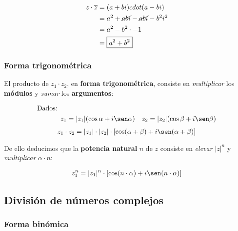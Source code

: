 \documentclass[12pt]{article}
\begin{document}
\begin{align*}
    z \cdot \overline{z} & = (a + bi) cdot (a - bi)                      \\
                         & = a^2 + \cancel{ abi} - \cancel{abi} - b^2i^2 \\
                         & = a^2 - b^2 \cdot -1                          \\
                         & = \boxed{a^2 + b^2}                           \\
\end{align*}

\subsubsection{Forma trigonométrica}

El producto de \(z_{1} \cdot z_{2}\),
en \textbf{forma trigonométrica},
consiste en \textit{multiplicar} los \textbf{módulos} y
\textit{sumar} los \textbf{argumentos}:

\begin{align*}
    \text{Dados: } &                                                                                     \\
                   & z_{1} = |z_{1}|(\cos\alpha + i\sen\alpha) & z_{2} = |z_{2}|(\cos\beta + i\sen\beta) \\
\end{align*}
\begin{align*}
    z_{1} \cdot z_{2} = |z_{1}| \cdot |z_{2}| \cdot [\cos(\alpha+\beta) + i\sen(\alpha+\beta)] \\
\end{align*}

De ello deducimos que la \textbf{potencia natural} \(n\) de \(z\)
consiste en \textit{elevar} \(|z|^n\)
y \textit{multiplicar} \(\alpha \cdot n\):

\begin{align*}
    z_{1}^n = |z_{1}|^n \cdot [\cos(n \cdot \alpha) + i\sen(n \cdot \alpha)] \\
\end{align*}

\subsection{División de números complejos}

\subsubsection{Forma binómica}
\end{document}
